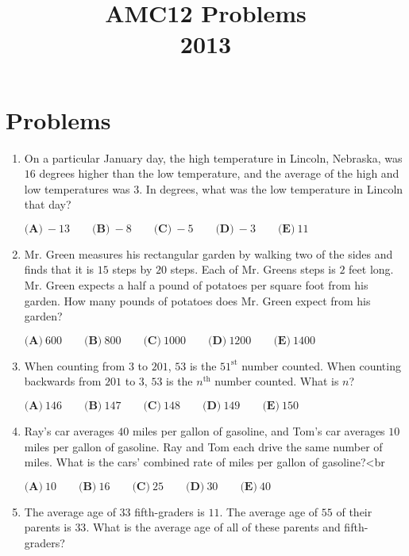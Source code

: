 \documentclass{article}
\title{AMC12 Problems \\ 2013}
\date{}
\begin{document}
\maketitle\thispagestyle{fancy}\newpage\section*{Problems}\begin{enumerate}[label=\arabic*., itemsep=0.5em]\item On a particular January day, the high temperature in Lincoln, Nebraska, was $16$ degrees higher than the low temperature, and the average of the high and low temperatures was $3$. In degrees, what was the low temperature in Lincoln that day?

$\textbf{(A)}\ -13 \qquad \textbf{(B)}\ -8 \qquad \textbf{(C)}\ -5 \qquad \textbf{(D)}\ -3 \qquad \textbf{(E)}\ 11$\par \vspace{0.5em}\item Mr. Green measures his rectangular garden by walking two of the sides and finds that it is $15$ steps by $20$ steps. Each of Mr. Greens steps is $2$ feet long. Mr. Green expects a half a pound of potatoes per square foot from his garden. How many pounds of potatoes does Mr. Green expect from his garden?

$\textbf{(A)}\ 600 \qquad \textbf{(B)}\ 800 \qquad \textbf{(C)}\ 1000 \qquad \textbf{(D)}\ 1200 \qquad \textbf{(E)}\ 1400$\par \vspace{0.5em}\item When counting from $3$ to $201$, $53$ is the $51^{\text{st}}$ number counted. When counting backwards from $201$ to $3$, $53$ is the $n^{\text{th}}$ number counted. What is $n$?

$\textbf{(A)}\ 146 \qquad \textbf{(B)}\ 147 \qquad \textbf{(C)}\ 148 \qquad \textbf{(D)}\ 149 \qquad \textbf{(E)}\ 150$\par \vspace{0.5em}\item Ray's car averages $40$ miles per gallon of gasoline, and Tom's car averages $10$ miles per gallon of gasoline. Ray and Tom each drive the same number of miles. What is the cars' combined rate of miles per gallon of gasoline?<br \>

$\textbf{(A)}\ 10 \qquad \textbf{(B)}\ 16 \qquad \textbf{(C)}\ 25 \qquad \textbf{(D)}\ 30 \qquad \textbf{(E)}\ 40$\par \vspace{0.5em}\item The average age of $33$ fifth-graders is $11$. The average age of $55$ of their parents is $33$. What is the average age of all of these parents and fifth-graders?


\end{enumerate}
\end{document}
